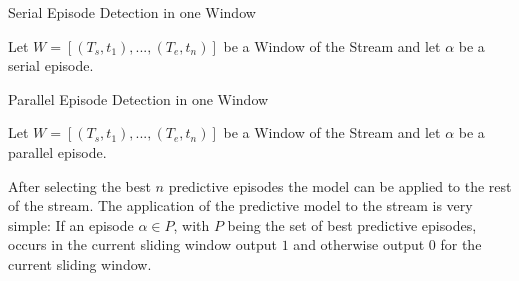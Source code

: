 \begin{algorithm}[H]
  \caption{Serial Episode Detection in one Window
    \label{alg_SerialEpisodeDetection}}
  \begin{algorithmic}[1]
    \Statex
    \Require Let $W=[(T_s,t_1),...,(T_e,t_n)]$ be a Window of the Stream and let $\alpha$ be a serial episode.
        \EndIf
      \EndWhile
      \State {}
    \EndFunction
  \end{algorithmic}
\end{algorithm}

\begin{algorithm}[H]
  \caption{Parallel Episode Detection in one Window
    \label{alg_ParallelEpisodeDetection}}
  \begin{algorithmic}[1]
    \Statex
    \Require Let $W=[(T_s,t_1),...,(T_e,t_n)]$ be a Window of the Stream and let $\alpha$ be a parallel episode.
      	\EndFor      
        \EndIf
      \EndWhile
      \State {}
    \EndFunction
  \end{algorithmic}
\end{algorithm}

After selecting the best $n$ predictive episodes the model can be applied to the rest of the stream.
The application of the predictive model to the stream is very simple: If an episode $\alpha \in P$, with $P$ being the set of best predictive episodes, occurs in the current sliding window output $1$ and otherwise output $0$ for the current sliding window.

